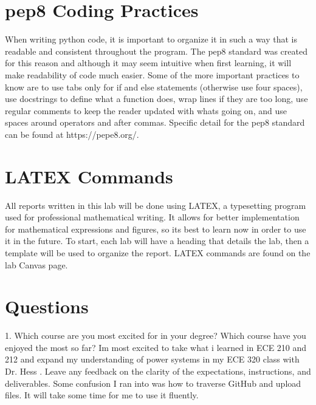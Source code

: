 \documentclass{article}
\begin{document}
\section{pep8 Coding Practices}
\hspace{\parindent}When writing python code, it is important to organize it in such a way that is readable and consistent throughout the program. The pep8 standard was created for this reason and although it may seem intuitive when first learning, it will make readability of code much easier. Some of the more important practices to know are to use tabs only for if and else statements (otherwise use four spaces), use docstrings to define what a function does, wrap lines if they are too long, use regular comments to keep the reader updated with whats going on, and use spaces around operators and after commas. Specific detail for the pep8 standard can be found at https://pepe8.org/. \par   
    
\section{LATEX Commands}
\hspace{\parindent}All reports written in this lab will be done using LATEX, a typesetting program used for professional mathematical writing. It allows for better implementation for mathematical expressions and figures, so its best to learn now in order to use it in the future. To start, each lab will have a heading that details the lab, then a template will be used to organize the report. LATEX commands are found on the lab Canvas page.

\section{Questions}
1. Which course are you most excited for in your degree? Which course have you enjoyed the most so far?
\newline
\newline
Im most excited to take what i learned in ECE 210 and 212 and expand my understanding of power systems in my ECE 320 class with Dr. Hess
\newline
{}. Leave any feedback on the clarity of the expectations, instructions, and deliverables.
\newline
\newline
Some confusion I ran into was how to traverse GitHub and upload files. It will take some time for me to use it fluently.
\end{document}
